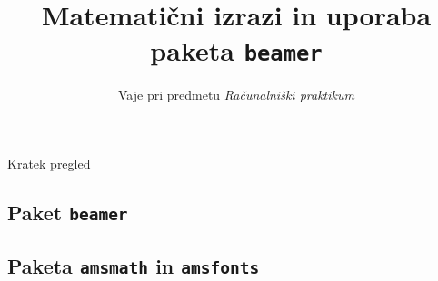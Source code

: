 \documentclass{beamer}
\theoremstyle{plain}
\begin{document}
\title{Matematični izrazi in uporaba paketa \texttt{beamer}}
\subtitle{Vaje pri predmetu \emph{Računalniški praktikum}}
\date{}

\begin{frame}
    \titlepage
\end{frame}



\begin{frame}{Kratek pregled}
    \tableofcontents %
\end{frame}

\begin{frame}
    \section{Paket \texttt{beamer}}
\end{frame}



\begin{frame}
    \section{Paketa \texttt{amsmath} in \texttt{amsfonts}}
\end{frame}


\end{document}
